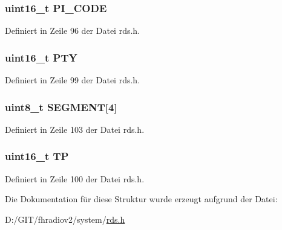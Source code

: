 \subsubsection[{P\+I\+\_\+\+C\+O\+D\+E}]{\setlength{\rightskip}{0pt plus 5cm}uint16\+\_\+t P\+I\+\_\+\+C\+O\+D\+E}\label{structgroup__2a_a5cd9b1f6413028425796c1129aa8fd87}


Definiert in Zeile 96 der Datei rds.\+h.

\hypertarget{structgroup__2a_a0474967478fbbc2c71b800d2e0132d45}{}
\subsubsection[{P\+T\+Y}]{\setlength{\rightskip}{0pt plus 5cm}uint16\+\_\+t P\+T\+Y}\label{structgroup__2a_a0474967478fbbc2c71b800d2e0132d45}


Definiert in Zeile 99 der Datei rds.\+h.

\hypertarget{structgroup__2a_a51d200a5620dec8e6cd7a76c63d03ed1}{}
\subsubsection[{S\+E\+G\+M\+E\+N\+T}]{\setlength{\rightskip}{0pt plus 5cm}uint8\+\_\+t S\+E\+G\+M\+E\+N\+T\mbox{[}4\mbox{]}}\label{structgroup__2a_a51d200a5620dec8e6cd7a76c63d03ed1}


Definiert in Zeile 103 der Datei rds.\+h.

\hypertarget{structgroup__2a_ab9e634c63b0d95a96716d5f6d7f06d72}{}
\subsubsection[{T\+P}]{\setlength{\rightskip}{0pt plus 5cm}uint16\+\_\+t T\+P}\label{structgroup__2a_ab9e634c63b0d95a96716d5f6d7f06d72}


Definiert in Zeile 100 der Datei rds.\+h.



Die Dokumentation für diese Struktur wurde erzeugt aufgrund der Datei\+:\begin{DoxyCompactItemize}
\item 
D\+:/\+G\+I\+T/fhradiov2/system/\hyperlink{rds_8h}{rds.\+h}\end{DoxyCompactItemize}
